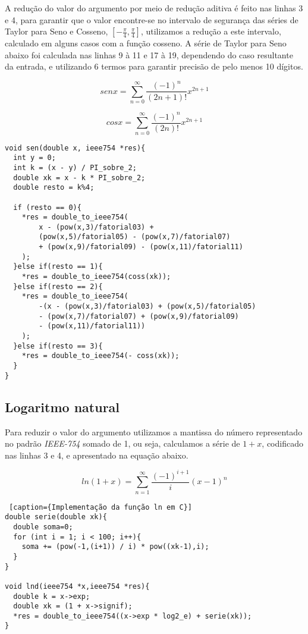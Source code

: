\documentclass[12pt]{article}
\begin{document}
A redução do valor do argumento por meio de redução aditiva é feito nas linhas 3 e 4, para garantir que o valor encontre-se no intervalo de segurança das séries de Taylor para Seno e Cosseno, $[-\frac{\pi}{4},\frac{\pi}{4}]$, utilizamos a redução a este intervalo, calculado em alguns casos com a função cosseno. A série de Taylor para Seno abaixo foi calculada nas linhas 9 à 11 e 17 à 19, dependendo do caso resultante da entrada, e utilizando 6 termos para garantir precisão de pelo menos 10 dígitos.

$$sen x = \sum_{n=0}^{\infty}{\frac{(-1)^n}{(2n + 1)!}x^{2n+1}}$$

$$cos x = \sum_{n=0}^{\infty}{\frac{(-1)^n}{(2n)!}x^{2n+1}}$$

\begin{lstlisting}[caption={Implementação da função seno em C}]
void sen(double x, ieee754 *res){
  int y = 0;
  int k = (x - y) / PI_sobre_2;
  double xk = x - k * PI_sobre_2;
  double resto = k%4;

  if (resto == 0){
    *res = double_to_ieee754(
        x - (pow(x,3)/fatorial03) +
        (pow(x,5)/fatorial05) - (pow(x,7)/fatorial07) 
        + (pow(x,9)/fatorial09) - (pow(x,11)/fatorial11)
    );
  }else if(resto == 1){
    *res = double_to_ieee754(coss(xk));
  }else if(resto == 2){
    *res = double_to_ieee754(
        -(x - (pow(x,3)/fatorial03) + (pow(x,5)/fatorial05) 
        - (pow(x,7)/fatorial07) + (pow(x,9)/fatorial09) 
        - (pow(x,11)/fatorial11))
    );
  }else if(resto == 3){
    *res = double_to_ieee754(- coss(xk));
  }
}
\end{lstlisting}

\newpage

\subsection{Logaritmo natural}

Para reduzir o valor do argumento utilizamos a mantissa do número representado no padrão \textit{IEEE-754} somado de 1, ou seja, calculamos a série de $1 + x$, codificado nas linhas 3 e 4, e apresentado na equação abaixo.

$$ln(1 + x) = \sum_{n=1}^{\infty}{\frac{(-1)^{i+1}}{i}(x-1)^{n}}$$

\begin{lstlisting} [caption={Implementação da função ln em C}]
double serie(double xk){
  double soma=0;
  for (int i = 1; i < 100; i++){
    soma += (pow(-1,(i+1)) / i) * pow((xk-1),i);
  }
}

void lnd(ieee754 *x,ieee754 *res){
  double k = x->exp;
  double xk = (1 + x->signif);
  *res = double_to_ieee754((x->exp * log2_e) + serie(xk));
}
\end{lstlisting}
\end{document}
